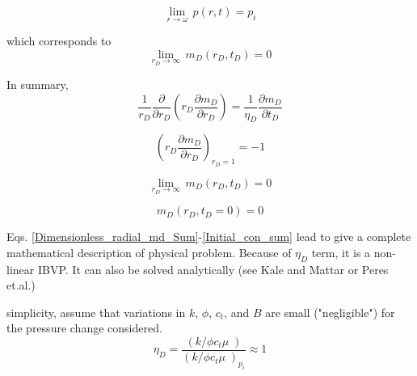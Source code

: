 \documentclass{llncs}
\numberwithin{equation}{section}
\numberwithin{figure}{section}
\numberwithin{table}{section}
\begin{document}
    \begin{equation*}
        \underset{r\to \omega }{\mathop{\lim }}\,p\left( r,t \right)={{p}_{i}}
    \end{equation*}

    which corresponds to
    \begin{equation}
        \underset{{{r}_{D}}\to \infty }{\mathop{\lim }}\,{{m}_{D}}\left( {{r}_{D}},{{t}_{D}} \right)=0
        \label{initial_condition_md}
    \end{equation}

    In summary, 
    \begin{equation}
        \frac{1}{{{r}_{D}}}\frac{\partial }{\partial {{r}_{D}}}\left( {{r}_{D}}\frac{\partial {{m}_{D}}}{\partial {{r}_{D}}} \right)=\frac{1}{{{\eta }_{D}}}\frac{\partial {{m}_{D}}}{\partial {{t}_{D}}}
        \label{Dimensionless_radial_md_Sum}
    \end{equation}

    \begin{equation}
        {{\left( {{r}_{D}}\frac{\partial {{m}_{D}}}{\partial {{r}_{D}}} \right)}_{{{r}_{D}}=1}}=-1
        \label{Boundary_1_sum}
    \end{equation}

    \begin{equation}
        \underset{{{r}_{D}}\to \infty }{\mathop{\lim }}\,{{m}_{D}}\left( {{r}_{D}},{{t}_{D}} \right)=0
        \label{Boundary_2_sum}
    \end{equation}

    \begin{equation}
        {{m}_{D}}\left( {{r}_{D}},{{t}_{D}}=0 \right)=0
        \label{Initial_con_sum}
    \end{equation}

    Eqs. \ref{Dimensionless_radial_md_Sum}-\ref{Initial_con_sum} lead to give a complete mathematical description of  physical problem. Because of ${{\eta }_{D}}$ term, it is a non-linear IBVP. It can also be solved analytically (see Kale and Mattar\cite{Kale_1980_1} or Peres et.al.\cite{Peres_1990_1})

     simplicity, assume that variations in $k$, $\phi$, $c_{t}$, and $B$ are small ("negligible") for the pressure change considered. 
     \begin{equation}
        {{\eta }_{D}}=\frac{\left( {k}/{\phi {{c}_{t}}\mu }\; \right)}{{{\left( {k}/{\phi {{c}_{t}}\mu }\; \right)}_{{{p}_{i}}}}}\approx 1
        \label{assumption}
    \end{equation}
\end{document}
